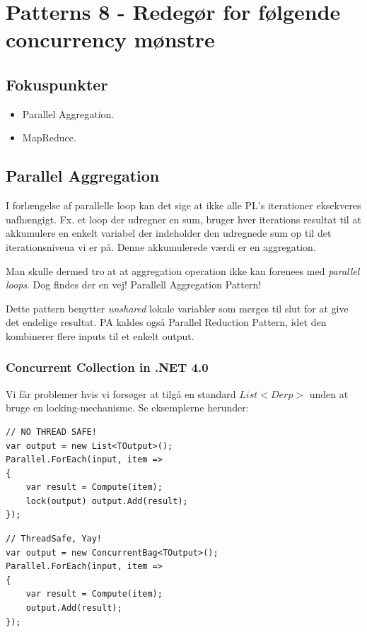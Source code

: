\section{Patterns 8 - Redegør for følgende concurrency mønstre}

\subsection{Fokuspunkter}

\begin{itemize}
	\item Parallel Aggregation.
	\item MapReduce.
\end{itemize}

\subsection{Parallel Aggregation}
I forlængelse af parallelle loop kan det sige at ikke alle PL's iterationer eksekveres uafhængigt. Fx. et loop der udregner en sum, bruger hver iterations resultat til at akkumulere en enkelt variabel der indeholder den udregnede sum op til det iterationsniveua vi er på. Denne akkumulerede værdi er en aggregation.

Man skulle dermed tro at at aggregation operation ikke kan forenees med \textit{parallel loops}. Dog findes der en vej! Parallell Aggregation Pattern!

Dette pattern benytter \textit{unshared} lokale variabler som merges til slut for at give det endelige resultat. PA kaldes også Parallel Reduction Pattern, idet den kombinerer flere inputs til et enkelt output.

\subsubsection{Concurrent Collection in .NET 4.0}
Vi får problemer hvis vi forsøger at tilgå en standard $List<Derp>$ unden at bruge en locking-mechanisme. Se eksemplerne herunder:

\begin{lstlisting}[caption=Brug af ikke-trådsikker List,
morekeywords={var, Parallel, lock}]
// NO THREAD SAFE!
var output = new List<TOutput>();
Parallel.ForEach(input, item => 
{
	var result = Compute(item);
	lock(output) output.Add(result);
});
\end{lstlisting}

\begin{lstlisting}[caption=Brug af trådsikker List,
morekeywords={var, Parallel, lock}]
// ThreadSafe, Yay!
var output = new ConcurrentBag<TOutput>();
Parallel.ForEach(input, item => 
{
	var result = Compute(item);
	output.Add(result);
});
\end{lstlisting}

